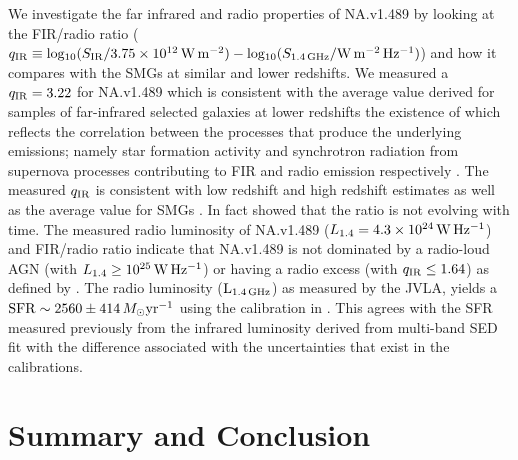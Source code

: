 \documentclass[iop,apj,useAMS,usenatbib]{emulateapj-rtx4}
\begin{document}
We investigate the far infrared and radio properties of NA.v1.489 by
looking at the FIR/radio ratio ($q_{\rm IR} \equiv {\rm
  log_{10}}(S_{\rm IR}/3.75\times10^{12}\,{\rm W\,m^{-2}})-{\rm
  log_{10}}(S_{\rm 1.4\,GHz}/{\rm W\,m^{-2}\,Hz^{-1}})$) and how it compares with the
SMGs at similar and lower redshifts. We measured a $q_{\rm IR}=3.22$ for NA.v1.489
which is consistent with the average value derived for samples of
far-infrared selected galaxies at lower redshifts \citep{Ivison2010b} the existence of
which reflects the correlation between the processes that produce the
underlying emissions; namely star formation activity and synchrotron
radiation from supernova processes contributing to FIR and radio emission
respectively \citep{Yun2001, Bell2003, Chapman2005, Ivison2010b,
  Elbaz2011, Pannella2015}. The measured $q_{\rm IR}$ is consistent
with low redshift \citep{Ivison2010b, Michalowski2010} and high redshift estimates
\citep{Pannella2015} as well as the average value for SMGs
\citep{Ivison2010b, Pannella2015}. In fact \citet{Ivison2010b} showed
that the ratio is not evolving with time. The measured radio
luminosity of NA.v1.489 ($L_{1.4}=4.3\times10^{24}\,{\rm W\,Hz^{-1}}$) and FIR/radio ratio indicate
that NA.v1.489 is not dominated by a radio-loud AGN (with
$L_{1.4}\geq10^{25}\,{\rm W\,Hz^{-1}}$) or having a radio excess (with
$q_{\rm IR}\leq1.64$) as defined by \citet{Yun2001}. The radio
luminosity ($\rm L_{1.4\,GHz}$) as measured by the JVLA,
yields a ${\rm SFR} \sim 2560\pm414\,M_{\odot}{\rm yr^{-1}}$ using the calibration in
\citet{Pannella2015}. This agrees with the SFR measured
previously from the infrared luminosity derived from multi-band SED
fit with the difference associated with the uncertainties that exist in the
calibrations.

\section{Summary and Conclusion}
\end{document}

